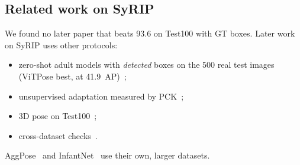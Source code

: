 \subsection{Related work on SyRIP}\label{sec:related}

We found no later paper that beats 93.6 on Test100 with GT boxes. Later work on SyRIP uses other protocols:
\begin{itemize}[leftmargin=*]
  \item zero-shot adult models with \emph{detected} boxes on the 500 real test images (ViTPose best, at 41.9~AP)~\citep{gama2025seven};
  \item unsupervised adaptation measured by PCK~\citep{bose2025shift};
  \item 3D pose on Test100~\citep{huang2023symmetry,zhou2024zedoi};
  \item cross-dataset checks~\citep{grafton2025neonatal,jahn2025comparison}.
\end{itemize}
AggPose~\citep{cao2022aggpose} and InfantNet~\citep{hui2026infantnet} use their own, larger datasets.

